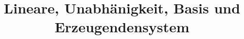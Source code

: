 \documentclass[11pt]{article}
\begin{document}
    \title{Lineare, Unabhänigkeit, Basis und Erzeugendensystem}
    \maketitle
    
\end{document}
